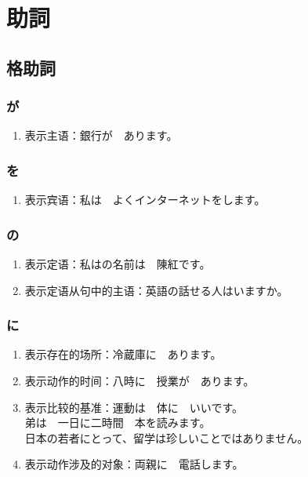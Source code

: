 \section{助詞}%


\subsection{格助詞}%

\subsubsection{が}%

\begin{enumerate}
  \item 表示主语：銀行が　あります。
\end{enumerate}


\subsubsection{を}%

\begin{enumerate}
  \item 表示宾语：私は　よくインターネットをします。
\end{enumerate}


\subsubsection{の}%

\begin{enumerate}
  \item 表示定语：私はの名前は　陳紅です。
  \item 表示定语从句中的主语：英語の話せる人はいますか。
\end{enumerate}


\subsubsection{に}%

\begin{enumerate}
  \item 表示存在的场所：冷蔵庫に　あります。
  \item 表示动作的时间：八時に　授業が　あります。
  \item 表示比较的基准：運動は　体に　いいです。\\ 
    弟は　一日に二時間　本を読みます。\\
    日本の若者にとって、留学は珍しいことではありません。
  \item 表示动作涉及的对象：両親に　電話します。
\end{enumerate}


